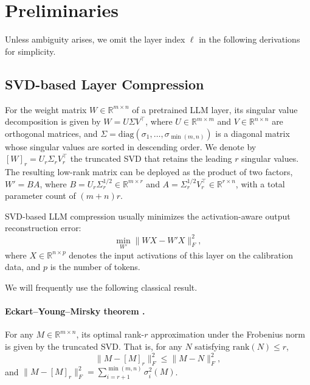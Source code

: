 \documentclass[a4paper,fleqn]{cas-dc}
\begin{document}
\section{Preliminaries}

Unless ambiguity arises, we omit the layer index $\ell$ in the following derivations for simplicity.

\subsection{SVD-based Layer Compression}

For the weight matrix $W \in \mathbb{R}^{m \times n}$ of a pretrained LLM layer, its singular value decomposition is given by $W = U \Sigma V^\top$, where $U \in \mathbb{R}^{m \times m}$ and $V \in \mathbb{R}^{n \times n}$ are orthogonal matrices, and $\Sigma = \mathrm{diag}(\sigma_1, \ldots, \sigma_{\min(m,n)})$ is a diagonal matrix whose singular values are sorted in descending order. We denote by $[W]_r = U_r \Sigma_r V_r^\top$ the truncated SVD that retains the leading $r$ singular values. The resulting low-rank matrix can be deployed as the product of two factors, $W' = BA$, where $B = U_r \Sigma_r^{1/2} \in \mathbb{R}^{m \times r}$ and $A = \Sigma_r^{1/2} V_r^\top \in \mathbb{R}^{r \times n}$, with a total parameter count of $(m+n)r$.

SVD-based LLM compression usually minimizes the activation-aware output reconstruction error:
\begin{equation}
\min_{W'} \|WX - W'X\|_F^2,
\label{eq:layer-output}
\end{equation}
where $X \in \mathbb{R}^{n \times p}$ denotes the input activations of this layer on the calibration data, and $p$ is the number of tokens.

We will frequently use the following classical result.

\paragraph{Eckart--Young--Mirsky theorem \citep{eckart1936eym}.}
For any $M \in \mathbb{R}^{m \times n}$, its optimal rank-$r$ approximation under the Frobenius norm is given by the truncated SVD. That is, for any $N$ satisfying $\mathrm{rank}(N) \le r$,
\begin{equation}
\|M - [M]_r\|_F^2 \le \|M - N\|_F^2,
\label{eq:eym}
\end{equation}
and $\|M - [M]_r\|_F^2 = \sum_{i=r+1}^{\min(m,n)} \sigma_i^2(M)$.
\end{document}
